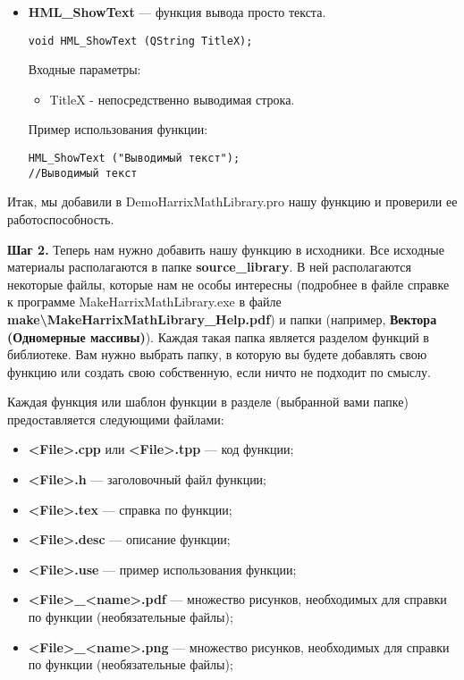 \begin{itemize}
\item \textbf{HML\_ShowText} --- функция вывода просто текста. 
\begin{lstlisting}[label=examplefunction14855, caption=Синтаксис функции HML\_ShowText]
void HML_ShowText (QString TitleX);
\end{lstlisting}
Входные параметры: 
\begin{itemize}   
     \item TitleX - непосредственно выводимая строка.
\end{itemize}
Пример использования функции:
\begin{lstlisting}[label=examplefunction14855, caption=Пример использования HML\_ShowText]
HML_ShowText ("Выводимый текст");
//Выводимый текст

\end{lstlisting}


\end{itemize}

Итак, мы добавили в DemoHarrixMathLibrary.pro нашу функцию и проверили ее работоспособность. 

\textbf{Шаг 2.}\label{step2} Теперь нам нужно добавить нашу функцию в исходники. Все исходные материалы располагаются в папке \textbf{source\_library}. В ней располагаются некоторые файлы, которые нам не особы интересны (подробнее в файле справке к программе MakeHarrixMathLibrary.exe в файле \textbf{make\textbackslash MakeHarrixMathLibrary\_Help.pdf}) и папки (например, \textbf{Вектора (Одномерные массивы)}). Каждая такая папка является разделом функций в библиотеке. Вам нужно выбрать папку, в которую вы будете добавлять свою функцию или создать свою собственную, если ничто не подходит по смыслу.

Каждая функция или шаблон функции в разделе (выбранной вами папке) предоставляется следующими файлами:
\begin{itemize}
\item \textbf{<File>.cpp} или \textbf{<File>.tpp} --- код функции;
\item \textbf{<File>.h} --- заголовочный файл функции;
\item \textbf{<File>.tex} --- справка по функции;
\item \textbf{<File>.desc} --- описание функции;
\item \textbf{<File>.use} --- пример использования функции;
\item \textbf{<File>\_<name>.pdf} --- множество рисунков, необходимых для справки по функции (необязательные файлы);
\item \textbf{<File>\_<name>.png} --- множество рисунков, необходимых для справки по функции (необязательные файлы);
\end{itemize}

